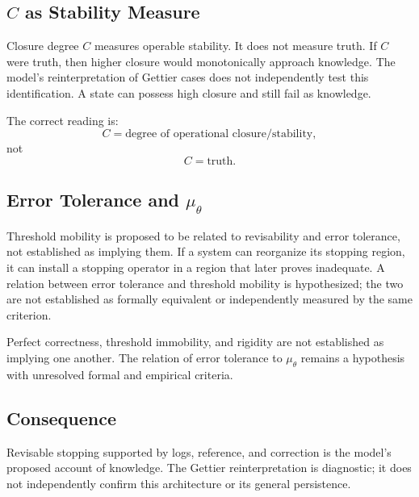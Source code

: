 \subsection{$C$ as Stability Measure}

Closure degree $C$ measures operable stability. It does not measure truth. If $C$ were truth, then higher closure would monotonically approach knowledge. The model's reinterpretation of Gettier cases does not independently test this identification. A state can possess high closure and still fail as knowledge.

The correct reading is:
\[
C = \text{degree of operational closure/stability},
\]
not
\[
C = \text{truth}.
\]

\subsection{Error Tolerance and $\mu_\theta$}

Threshold mobility is proposed to be related to revisability and error tolerance, not established as implying them. If a system can reorganize its stopping region, it can install a stopping operator in a region that later proves inadequate. A relation between error tolerance and threshold mobility is hypothesized; the two are not established as formally equivalent or independently measured by the same criterion.

Perfect correctness, threshold immobility, and rigidity are not established as implying one another. The relation of error tolerance to $\mu_\theta$ remains a hypothesis with unresolved formal and empirical criteria.

\subsection{Consequence}

Revisable stopping supported by logs, reference, and correction is the model's proposed account of knowledge. The Gettier reinterpretation is diagnostic; it does not independently confirm this architecture or its general persistence.

\bigskip
